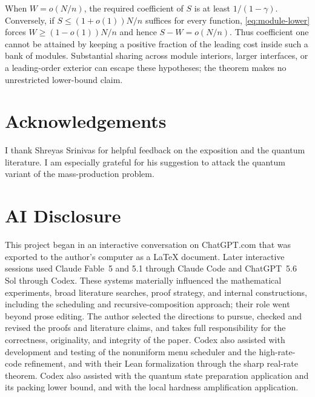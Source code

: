 \documentclass[11pt]{article}
\newif\ifanonymous
\begin{document}
When $W=o(N/n)$, the required coefficient of $S$ is at least
$1/(1-\gamma)$.  Conversely, if $S\le(1+o(1))N/n$ suffices for every
function, \eqref{eq:module-lower} forces $W\ge(1-o(1))N/n$ and hence
$S-W=o(N/n)$.  Thus coefficient one cannot be attained by keeping a
positive fraction of the leading cost inside such a bank of modules.
Substantial sharing across module interiors, larger interfaces, or a
leading-order exterior can escape these hypotheses; the theorem makes
no unrestricted lower-bound claim.

\ifanonymous\else
\section*{Acknowledgements}

I thank Shreyas Srinivas for helpful feedback on the exposition and the
quantum literature.  I am especially grateful for his suggestion to attack
the quantum variant of the mass-production problem.
\fi

\section*{AI Disclosure}

This project began in an interactive conversation on ChatGPT.com that was
exported to the author's computer as a \LaTeX{} document.  Later interactive
sessions used Claude Fable~5 and 5.1 through Claude Code and ChatGPT~5.6 Sol
through Codex.  These systems materially influenced the mathematical
experiments, broad literature searches, proof strategy, and internal
constructions, including the scheduling and recursive-composition approach;
their role went beyond prose editing.  The author selected the directions to
pursue, checked and revised the proofs and literature claims, and takes full
responsibility for the correctness, originality, and integrity of the paper.
Codex also assisted with development and testing of the nonuniform menu
scheduler and the high-rate-code refinement, and with their Lean formalization
through the sharp real-rate theorem.  Codex also assisted with the
quantum state preparation application and its packing lower bound,
and with the local hardness amplification application.
\end{document}
